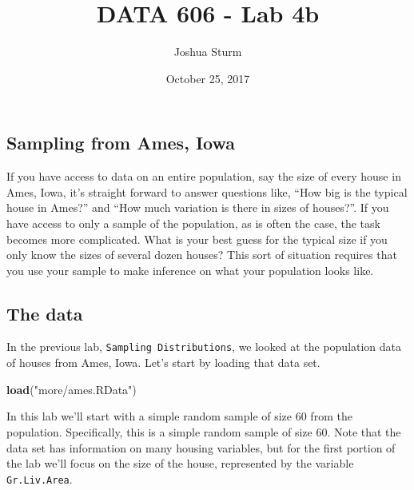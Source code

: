 \documentclass[]{article}
\title{DATA 606 - Lab 4b}
\author{Joshua Sturm}
\date{October 25, 2017}
\newenvironment{Shaded}{\begin{snugshade}}{\end{snugshade}}
\newcommand{\KeywordTok}[1]{\textcolor[rgb]{0.13,0.29,0.53}{\textbf{#1}}}
\newcommand{\DecValTok}[1]{\textcolor[rgb]{0.00,0.00,0.81}{#1}}
\newcommand{\StringTok}[1]{\textcolor[rgb]{0.31,0.60,0.02}{#1}}
\newcommand{\CommentTok}[1]{\textcolor[rgb]{0.56,0.35,0.01}{\textit{#1}}}
\newcommand{\OperatorTok}[1]{\textcolor[rgb]{0.81,0.36,0.00}{\textbf{#1}}}
\newcommand{\NormalTok}[1]{#1}
\begin{document}
\maketitle

\subsection{Sampling from Ames, Iowa}\label{sampling-from-ames-iowa}

If you have access to data on an entire population, say the size of
every house in Ames, Iowa, it's straight forward to answer questions
like, ``How big is the typical house in Ames?'' and ``How much variation
is there in sizes of houses?''. If you have access to only a sample of
the population, as is often the case, the task becomes more complicated.
What is your best guess for the typical size if you only know the sizes
of several dozen houses? This sort of situation requires that you use
your sample to make inference on what your population looks like.

\subsection{The data}\label{the-data}

In the previous lab, \texttt{Sampling\ Distributions}, we looked at the
population data of houses from Ames, Iowa. Let's start by loading that
data set.

\begin{Shaded}
\begin{Highlighting}[]
\KeywordTok{load}\NormalTok{(}\StringTok{"more/ames.RData"}\NormalTok{)}
\end{Highlighting}
\end{Shaded}

In this lab we'll start with a simple random sample of size 60 from the
population. Specifically, this is a simple random sample of size 60.
Note that the data set has information on many housing variables, but
for the first portion of the lab we'll focus on the size of the house,
represented by the variable \texttt{Gr.Liv.Area}.

\begin{Shaded}
\end{Shaded}
\end{document}
